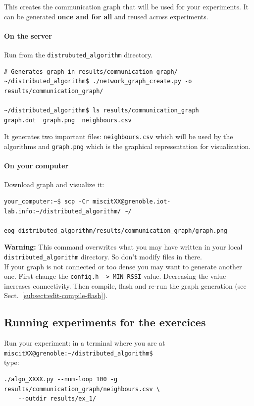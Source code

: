 \documentclass{article}
\begin{document}
This creates the communication graph that
will be used for your experiments. It can be generated \textbf{once and for all} and
reused across experiments.

\paragraph{On the server}

Run from the \verb=distrubuted_algorithm= directory.

\begin{verbatim}# Generates graph in results/communication_graph/
~/distributed_algorithm$ ./network_graph_create.py -o results/communication_graph/

~/distributed_algorithm$ ls results/communication_graph
graph.dot  graph.png  neighbours.csv \end{verbatim}

It generates two important files:
\texttt{neighbours.csv} which will be used by the algorithms and
\texttt{graph.png} which is the graphical representation for visualization.

\paragraph{On your computer} Download graph and visualize it:
\begin{verbatim}
your_computer:~$ scp -Cr miscitXX@grenoble.iot-lab.info:~/distributed_algorithm/ ~/

eog distributed_algorithm/results/communication_graph/graph.png
\end{verbatim}

\textbf{Warning:} This command overwrites  what you may have written
in your local \verb=distributed_algorithm= directory. So don't modify files in there.\\

If your graph is not connected or too dense you may want to generate another one.
First change the \verb=config.h -> MIN_RSSI= value. Decreasing the value
increases connectivity. Then compile, flash and re-run the graph generation (see Sect.~\ref{subsect:edit-compile-flash}).


\subsection{Running experiments for the exercices}

Run your experiment: in a terminal where you are at \\
\verb=miscitXX@grenoble:~/distributed_algorithm$= \\
type:
\begin{verbatim}
./algo_XXXX.py --num-loop 100 -g results/communication_graph/neighbours.csv \
    --outdir results/ex_1/
\end{verbatim}
\end{document}
